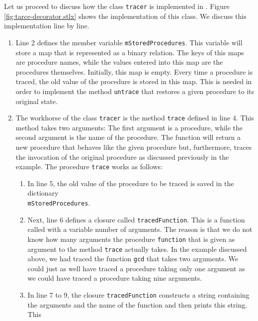 Let us proceed to discuss how the class \texttt{tracer} is implemented in \setlx.  Figure
\ref{fig:tarce-decorator.stlx} shows the implementation of this class.  We discuss this
implementation line by line.
\begin{enumerate}
\item Line 2 defines the member variable \texttt{mStoredProcedures}.  This variable will store a map
      that is represented as a binary relation.  The keys of this maps are procedure names, while the
      values entered into this map are the procedures themselves.  Initially, this map is empty.  Every time a
      procedure is traced, the old value of the procedure is stored in this map.  This is needed in
      order to implement the method \texttt{untrace} that restores a given procedure to its original
      state.
\item The workhorse of the class \texttt{tracer} is the method \texttt{trace} defined in line 4.
      This method takes two arguments:  The first argument is a procedure, while the second argument
      is the name of the procedure.  The function will return a new procedure that behaves like the
      given procedure but, furthermore, traces the invocation of the original procedure as discussed
      previously in the example.  The procedure \texttt{trace} works as follows:
      \begin{enumerate}
      \item In line 5, the old value of the procedure to be traced is saved in the dictionary 
            \\[0.2cm]
            \hspace*{1.3cm}
            \texttt{mStoredProcedures}.
      \item Next, line 6 defines a closure called \texttt{tracedFunction}.  This is a function    
            called with a variable number of arguments.  The reason is that we do
            not know how many 
            arguments the procedure \texttt{function} that is given as argument to the method
            \texttt{trace} actually takes.  In the example discussed above, we had traced the
            function \texttt{gcd} that takes two arguments.  We could just as well have traced a
            procedure taking only one argument as we could have traced a procedure taking nine
            arguments.
      \item In line 7 to 9, the closure \texttt{tracedFunction} constructs a string containing the
            arguments and the name of the function and then prints this string.  This

\end{enumerate}
\end{enumerate}
